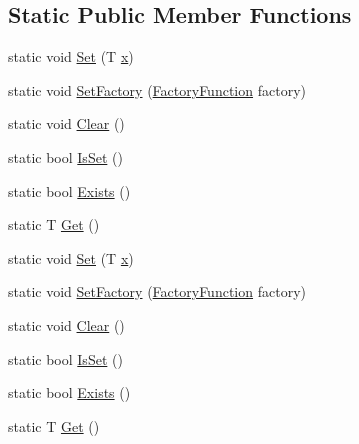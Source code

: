 \subsection*{Static Public Member Functions}
\begin{DoxyCompactItemize}
\item 
static void \mbox{\hyperlink{classtesting_1_1_default_value_a5698814be364b9ac26e72ad37d6ff14e}{Set}} (T \mbox{\hyperlink{_obj__test_2lib_2googletest-master_2googlemock_2test_2gmock-matchers__test_8cc_a6150e0515f7202e2fb518f7206ed97dc}{x}})
\item 
static void \mbox{\hyperlink{classtesting_1_1_default_value_af012445ff5b194940c1427529707cb91}{Set\+Factory}} (\mbox{\hyperlink{classtesting_1_1_default_value_a5763a68d75e0a4c97fcaff708e2df803}{Factory\+Function}} factory)
\item 
static void \mbox{\hyperlink{classtesting_1_1_default_value_a8163037b60311177cb211f070c512ee3}{Clear}} ()
\item 
static bool \mbox{\hyperlink{classtesting_1_1_default_value_ad49febe2c944cbbd06451ba7d0366ca1}{Is\+Set}} ()
\item 
static bool \mbox{\hyperlink{classtesting_1_1_default_value_aec1ff9b510af7dbb86c837fd2409fd70}{Exists}} ()
\item 
static T \mbox{\hyperlink{classtesting_1_1_default_value_a4dc6dfee4cbc9cdb36f5c9cde5cf2b83}{Get}} ()
\item 
static void \mbox{\hyperlink{classtesting_1_1_default_value_a5698814be364b9ac26e72ad37d6ff14e}{Set}} (T \mbox{\hyperlink{_obj__test_2lib_2googletest-master_2googlemock_2test_2gmock-matchers__test_8cc_a6150e0515f7202e2fb518f7206ed97dc}{x}})
\item 
static void \mbox{\hyperlink{classtesting_1_1_default_value_af012445ff5b194940c1427529707cb91}{Set\+Factory}} (\mbox{\hyperlink{classtesting_1_1_default_value_a5763a68d75e0a4c97fcaff708e2df803}{Factory\+Function}} factory)
\item 
static void \mbox{\hyperlink{classtesting_1_1_default_value_a8163037b60311177cb211f070c512ee3}{Clear}} ()
\item 
static bool \mbox{\hyperlink{classtesting_1_1_default_value_ad49febe2c944cbbd06451ba7d0366ca1}{Is\+Set}} ()
\item 
static bool \mbox{\hyperlink{classtesting_1_1_default_value_aec1ff9b510af7dbb86c837fd2409fd70}{Exists}} ()
\item 
static T \mbox{\hyperlink{classtesting_1_1_default_value_a4dc6dfee4cbc9cdb36f5c9cde5cf2b83}{Get}} ()

\end{DoxyCompactItemize}
